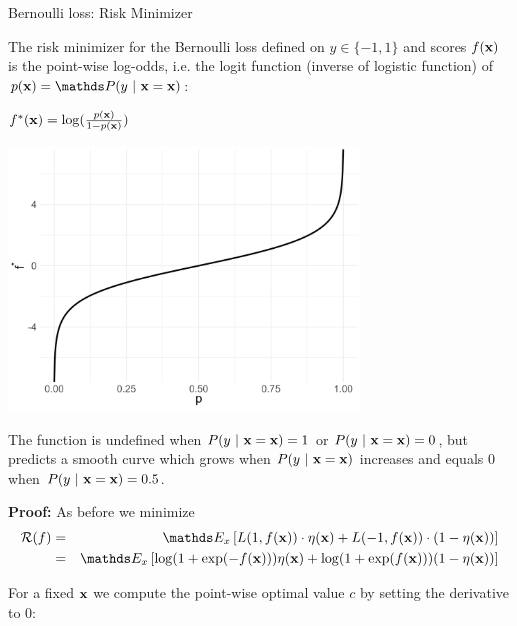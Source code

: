 \documentclass[11pt,compress,t,notes=noshow, xcolor=table]{beamer}
\begin{document}
\begin{vbframe}{Bernoulli loss: Risk Minimizer}
\begin{footnotesize}
\end{footnotesize}

\framebreak 

The risk minimizer for the Bernoulli loss defined on $y \in \{-1, 1\}$ and scores $f(\mathbf{x})$ is the point-wise log-odds, i.e. the logit function (inverse of logistic function) of $p(\xv) = \P(y~|~\xv = \xv)$:

\begin{minipage}{0.3\textwidth} 
	\centering
	{$f^{\ast}(\mathbf{x}) =  \log (\frac{p(\mathbf{x})}{1-p(\mathbf{x})})$}
\end{minipage}
\hspace{-.03\textwidth}
\begin{minipage}{0.7\textwidth}
	\centering	
	\includegraphics[width=0.7\textwidth]{figure/logistic_inverse.png}
\end{minipage}

The function is undefined when $P(y~|~\mathbf{x} = \mathbf{x}) = 1$ or $P(y~|~\mathbf{x} = \mathbf{x}) = 0$, but predicts a smooth curve which grows when $P(y~|~\mathbf{x} = \mathbf{x})$ increases and equals $0$ when $P(y~|~\mathbf{x} = \mathbf{x}) = 0.5$.

\framebreak 

\textbf{Proof: } As before we minimize 
\begin{eqnarray*}
  \riskf &=& \E_x \left[L(1, \fx) \cdot \eta(\xv) + L(-1, \fx) \cdot (1 - \eta(\xv)) \right] \\
  &=& \E_x \left[ \log(1 + \exp(- \fx)) \eta(\xv)+ \log(1 + \exp(\fx)) (1 - \eta(\xv)) \right] 
\end{eqnarray*}

For a fixed $\mathbf{x}$ we compute the point-wise optimal value $c$ by setting the derivative to $0$: 


\end{vbframe}
\end{document}
